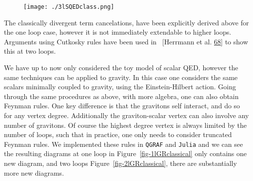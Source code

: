 \documentclass[
  11pt,
  a4paper,
  DIV=11,
  numbers=noendperiod,
  twoside]{scrreprt}
\DeclareRobustCommand{\[}{\begin{equation}}
\DeclareRobustCommand{\]}{\end{equation}}
\begin{document}
\begin{figure}


{\centering \texttt{[image: ./3lSQEDclass.png]}

}

\end{figure}

The classically divergent term cancelations, have been explicitly
derived above for the one loop case, however it is not immediately
extendable to higher loops. Arguments using Cutkosky rules have been
used in ~{[}Herrmann et al.
\protect\hyperlink{ref-Herrmann:2021tct}{68}{]} to show this at two
loops.

We have up to now only considered the toy model of scalar QED, however
the same techniques can be applied to gravity. In this case one
considers the same scalars minimally coupled to gravity, using the
Einstein-Hilbert action. Going through the same procedures as above,
with more algebra, one can also obtain Feynman rules. One key difference
is that the gravitons self interact, and do so for any vertex degree.
Additionally the graviton-scalar vertex can also involve any number of
gravitons. Of course the highest degree vertex is always limited by the
number of loops, such that in practice, one only needs to consider
truncated Feynman rules. We implemented these rules in \texttt{QGRAF}
and \texttt{Julia} and we can see the resulting diagrams at one loop in
Figure~\ref{fig-1lGRclassical} only contains one new diagram, and two
loops Figure~\ref{fig-2lGRclassical}, there are substantially more new
diagrams.
\end{document}
